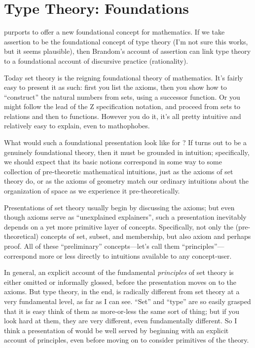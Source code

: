 \chapter{Type Theory: Foundations}
\label{sect:foundations}

\HoTT{} purports to offer a new foundational concept for mathematics.  If
we take assertion to be the foundational concept of type theory (I'm
not sure this works, but it seems plausible), then Brandom's account
of assertion can link type theory to a foundational account of
discursive practice (rationality).

Today set theory is the reigning foundational theory of mathematics.
It's fairly easy to present it as such: first you list the axioms,
then you show how to ``construct'' the natural numbers from sets,
using a successor function.  Or you might follow the lead of the Z
specification notation, and proceed from
sets to relations and then to functions.  However you do it, it's all
pretty intuitive and relatively easy to explain, even to mathophobes.

What would such a foundational presentation look like for \HoTT{}?  If
\HoTT{} turns out to be a genuinely foundational theory, then it must be
grounded in intuition; specifically, we should expect that its basic
notions correspond in some way to some collection of pre-theoretic
mathematical intuitions, just as the axioms of set theory do, or as
the axioms of geometry match our ordinary intuitions about the
organization of space as we experience it pre-theoretically.

Presentations of set theory usually begin by discussing the axioms;
but even though axioms serve as ``unexplained explainers'', such a
presentation inevitably depends on a yet more primitive layer of
concepts.  Specifically, not only the (pre-theoretical) concepts of
set, subset, and membership, but also axiom and perhaps proof.  All of
these ``preliminary'' concepts---let's call them
``principles''---correspond more or less directly to intuitions
available to any concept-user.

In general, an explicit account of the fundamental \textit{principles}
of set theory is either omitted or informally glossed, before the
presentation moves on to the axioms.  But type theory, in the end, is
radically different from set theory at a very fundamental level, as
far as I can see.  ``Set'' and ``type'' are so easily grasped that it
is easy think of them as more-or-less the same sort of thing; but if
you look hard at them, they are very different, even fundamentally
different.  So I think a presentation of \HoTT{} would be well served by
beginning with an explicit account of principles, even before moving
on to consider primitives of the theory.


